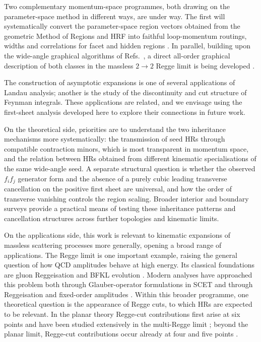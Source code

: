 \documentclass[a4paper,11pt]{article}
\begin{document}
Two complementary momentum-space programmes, both drawing on the
parameter-space method in different ways, are under way.  The first will
systematically convert the parameter-space region vectors obtained from the
geometric Method of Regions and HRF into faithful loop-momentum routings,
widths and correlations for facet and hidden regions
\cite{GardiZhu:2026regions}.  In parallel, building upon the wide-angle
graphical algorithms of Refs.~\cite{Gardi:2022khw,Ma:2023hrt}, a direct
all-order graphical description of both classes in the massless \(2\to2\)
Regge limit is being developed \cite{GardiHerzogJonesMa:2026regge}.

The construction of asymptotic expansions is one of several applications of
Landau analysis; another is the study of the discontinuity and cut structure
of Feynman integrals.  These applications are related, and we envisage using
the first-sheet analysis developed here to explore their connections in future
work.

On the theoretical side, priorities are to understand the two inheritance
mechanisms more systematically: the transmission of seed HRs through
compatible contraction minors, which is most transparent in momentum space,
and the relation between HRs obtained from different kinematic specialisations
of the same wide-angle seed.  A separate structural question is whether the
observed \(f_i f_j\) generator form and the absence of a purely cubic leading
transverse cancellation on the positive first sheet are universal, and how
the order of transverse vanishing controls the region scaling.  Broader
interior and boundary surveys provide a practical means of testing these
inheritance patterns and cancellation structures across further topologies
and kinematic limits.

On the applications side, this work is relevant to kinematic expansions of
massless scattering processes more generally, opening a broad range of
applications.  The Regge limit is one important example, raising the general
question of how QCD amplitudes behave at high energy.  Its classical
foundations are gluon Reggeisation and BFKL evolution
\cite{Lipatov1976,Fadin:1975cb,Kuraev:1976ge,Kuraev:1977fs,Balitsky:1978ic}.
Modern analyses have approached this problem both through Glauber-operator
formulations in SCET
\cite{Rothstein:2016bsq,Moult:2022lfy,Gao:2024qsg} and through Reggeisation
and fixed-order amplitudes
\cite{DelDuca:2001gu,Bret:2011xm,Caron-Huot:2017fxr,Caola:2021izf,
Falcioni:2021dgr,Falcioni:2021buo}.  Within this broader
programme, one theoretical question is the appearance of Regge cuts, to which
HRs are expected to be relevant.  In the planar theory Regge-cut contributions
first arise at six points and have been studied extensively in the multi-Regge limit
\cite{Bartels:2008ce,Dixon:2012yy,Caron-Huot:2019vjl}; beyond the planar limit,
Regge-cut contributions occur already at four and five points
\cite{Caron-Huot:2017fxr,Falcioni:2021dgr,Caron-Huot:2020vlo,Abreu:2024xoh}.
\end{document}
